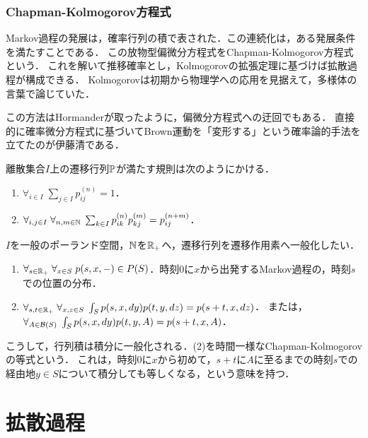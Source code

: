 \documentclass[uplatex,dvipdfmx]{jsreport}
\begin{document}
\subsection{Chapman-Kolmogorov方程式}

\begin{tcolorbox}[colframe=ForestGreen, colback=ForestGreen!10!white,breakable,colbacktitle=ForestGreen!40!white,coltitle=black,fonttitle=\bfseries\sffamily,
title=熱核の半群性]
    Markov過程の発展は，確率行列の積で表された．この連続化は，ある発展条件を満たすことである．
    この放物型偏微分方程式をChapman-Kolmogorov方程式という．
    これを解いて推移確率とし，Kolmogorovの拡張定理に基づけば拡散過程が構成できる．
    Kolmogorovは初期から物理学への応用を見据えて，多様体の言葉で論じていた．

    この方法はHormanderが取ったように，偏微分方程式への迂回でもある．
    直接的に確率微分方程式に基づいてBrown運動を「変形する」という確率論的手法を立てたのが伊藤清である．
\end{tcolorbox}

\begin{discussion}
    離散集合$I$上の遷移行列$\mathbb{P}$が満たす規則は次のようにかける．
    \begin{enumerate}
        \item $\forall_{i\in I}\;\sum_{j\in I}p_{ij}^{(n)}=1$．
        \item $\forall_{i,j\in I}\;\forall_{n,m\in\mathbb{N}}\;\sum_{k\in I}p_{ik}^{(n)}p_{kj}^{(m)}=p_{ij}^{(n+m)}$．
    \end{enumerate}
    $I$を一般のポーランド空間，$\mathbb{N}$を$\mathbb{R}_+$へ，遷移行列を遷移作用素へ一般化したい．
    \begin{enumerate}
        \item $\forall_{s\in\mathbb{R}_+}\;\forall_{x\in S}\;p(s,x,-)\in P(S)$．時刻$0$に$x$から出発するMarkov過程の，時刻$s$での位置の分布．
        \item $\forall_{s,t\in\mathbb{R}_+}\;\forall_{x,z\in S}\;\int_Sp(s,x,dy)p(t,y,dz)=p(s+t,x,dz)$．
        または，$\forall_{A\in\mathcal{B}(S)}\;\int_Sp(s,x,dy)p(t,y,A)=p(s+t,x,A)$．
    \end{enumerate}
    こうして，行列積は積分に一般化される．(2)を時間一様なChapman-Kolmogorovの等式という．
    これは，時刻$0$に$x$から初めて，$s+t$に$A$に至るまでの時刻$s$での経由地$y\in S$について積分しても等しくなる，という意味を持つ．
\end{discussion}

\chapter{拡散過程}
\end{document}
